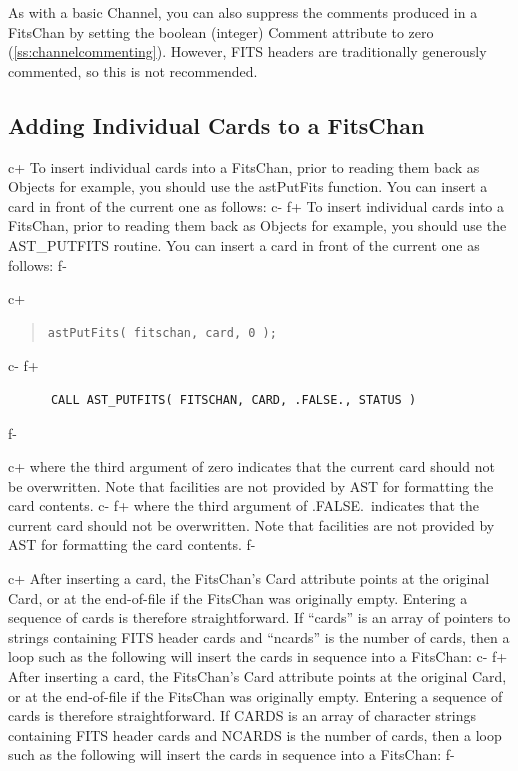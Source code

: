 \documentclass[twoside,11pt]{article}
\newcommand{\secref}[1]{\S\ref{#1}}
\renewcommand{\secref}[1]{\ref{#1}}
\begin{document}
As with a basic Channel, you can also suppress the comments produced
in a FitsChan by setting the boolean (integer) Comment attribute to
zero (\secref{ss:channelcommenting}). However, FITS headers are
traditionally generously commented, so this is not recommended.

\subsection{\label{ss:addingfitscards}Adding Individual Cards to a FitsChan}

c+
To insert individual cards into a FitsChan, prior to reading them back
as Objects for example, you should use the astPutFits function. You
can insert a card in front of the current one as follows:
c-
f+
To insert individual cards into a FitsChan, prior to reading them back
as Objects for example, you should use the AST\_PUTFITS routine. You
can insert a card in front of the current one as follows:
f-

c+
\begin{quote}
\small
\begin{verbatim}
astPutFits( fitschan, card, 0 );
\end{verbatim}
\normalsize
\end{quote}
c-
f+
\small
\begin{verbatim}
      CALL AST_PUTFITS( FITSCHAN, CARD, .FALSE., STATUS )
\end{verbatim}
\normalsize
f-

c+
where the third argument of zero indicates that the current card
should not be overwritten. Note that facilities are not provided by
AST for formatting the card contents.
c-
f+
where the third argument of .FALSE.\ indicates that the current card
should not be overwritten. Note that facilities are not provided by
AST for formatting the card contents.
f-

c+
After inserting a card, the FitsChan's Card attribute points at the
original Card, or at the end-of-file if the FitsChan was originally
empty. Entering a sequence of cards is therefore straightforward. If
``cards'' is an array of pointers to strings containing FITS header
cards and ``ncards'' is the number of cards, then a loop such as the
following will insert the cards in sequence into a FitsChan:
c-
f+
After inserting a card, the FitsChan's Card attribute points at the
original Card, or at the end-of-file if the FitsChan was originally
empty. Entering a sequence of cards is therefore straightforward. If
CARDS is an array of character strings containing FITS header cards
and NCARDS is the number of cards, then a loop such as the following
will insert the cards in sequence into a FitsChan:
f-
\end{document}
